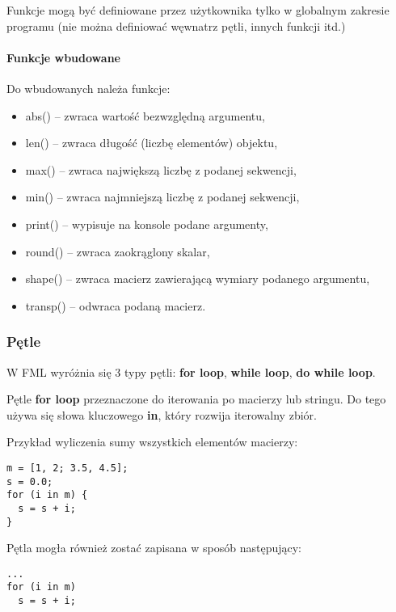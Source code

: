 \documentclass[12pt,a4paper]{article}
\begin{document}
Funkcje mogą być definiowane przez użytkownika tylko w globalnym zakresie programu (nie można definiować węwnatrz pętli, innych funkcji itd.)

\paragraph{Funkcje wbudowane}

\medskip
Do wbudowanych należa funkcje:

\begin{itemize}

  \item abs() -- zwraca wartość bezwzględną argumentu,
  \item len() -- zwraca długość (liczbę elementów) objektu,
  \item max() -- zwraca największą liczbę z podanej sekwencji,
  \item min() -- zwraca najmniejszą liczbę z podanej sekwencji,
  \item print() -- wypisuje na konsole podane argumenty,
  \item round() -- zwraca zaokrąglony skalar,
  \item shape() -- zwraca macierz zawierającą wymiary podanego argumentu,
  \item transp() -- odwraca podaną macierz.
  
\end{itemize}

\subsubsection{Pętle}

W FML wyróżnia się 3 typy pętli: \textbf{for loop}, \textbf{while loop}, \textbf{do while loop}.

\medskip

Pętle \textbf{for loop} przeznaczone do iterowania po macierzy lub stringu. Do tego używa się słowa kluczowego \textbf{in}, który rozwija iterowalny zbiór.

\medskip
Przykład wyliczenia sumy wszystkich elementów macierzy:

\begin{lstlisting}
m = [1, 2; 3.5, 4.5];
s = 0.0;
for (i in m) {
  s = s + i;
}
\end{lstlisting}

Pętla mogła również zostać zapisana w sposób następujący:
\begin{lstlisting}
...
for (i in m)
  s = s + i;
\end{lstlisting}
\end{document}
